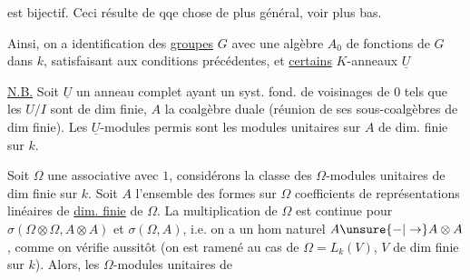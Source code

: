 est bijectif. Ceci résulte de qqe chose de
plus général, voir plus bas.

Ainsi, on a identification des \uline{groupes} $G$
avec une algèbre $A_0$ de fonctions de $G$ dans $k$,
satisfaisant aux conditions précédentes, et
\uline{certains}  $K$-anneaux $\underline U$

\uline{N.B.} Soit $\underline U$ un anneau  
complet ayant un syst. fond. de
voisinages de $0$  tels que les $U/I$ sont
de dim finie, $A$ la coalgèbre duale
(réunion  de ses sous-coalgèbres de
dim finie). Les $\underline U$-modules
permis sont les modules unitaires
sur $A$ de dim. finie sur $k$.

Soit $\Omega$ une   associative avec
$1$, considérons la classe des $\Omega$-modules
unitaires  de dim finie sur $k$.
Soit $A$ l'ensemble des formes sur $\Omega$
coefficients de représentations linéaires
de \uline{dim. finie} de $\Omega$. La multiplication
de $\Omega$ est continue pour $\sigma(\Omega\otimes\Omega,A\otimes A)$
et $\sigma(\Omega,A)$, i.e. on a un
hom naturel $A\unsure{-|\to} A\otimes A$, comme
on vérifie aussitôt (on est ramené
au cas de $\Omega=L_{k}(V)$, $V$ de dim
finie sur $k$).
Alors, les $\Omega$-modules
unitaires   de
